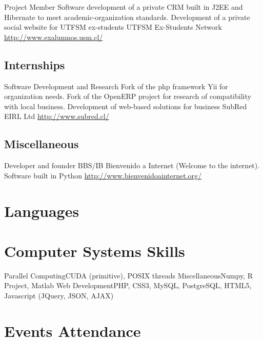 \documentclass[11pt,a4paper]{moderncv}
\begin{document}
        {Project Member}
        {Software development of a private CRM built in J2EE and Hibernate to meet academic-organization standards. Development of a private social website for UTFSM ex-students}
        {UTFSM Ex-Students Network}
        {}
        {\url{http://www.exalumnos.usm.cl/}}
        
        
\subsection{Internships}


        {Software Development and Research}
        {Fork of the php framework Yii for organization needs. Fork of the OpenERP project for research of compatibility with local business. Development of web-based solutions for business}
        {SubRed EIRL Ltd}
        {}
        {\url{http://www.subred.cl/}}
        
        
\subsection{Miscellaneous}


        {Developer and founder}
        {BBS/IB Bienvenido a Internet (Welcome to the internet). Software built in Python}
        {}
        {}
        {\url{http://www.bienvenidoainternet.org/}}
        
\section{Languages}

\section{Computer Systems Skills}
           {Parallel Computing}{CUDA (primitive), POSIX threads}
           {Miscellaneous}{Numpy, R Project, Matlab}
           {Web Development}{PHP, CSS3, MySQL, PostgreSQL, HTML5, Javascript (JQuery, JSON, AJAX)}

\section{Events Attendance}
\end{document}
